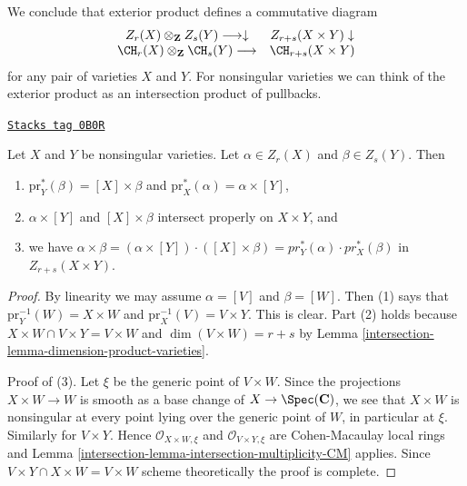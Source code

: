 We conclude that exterior product defines a commutative diagram
$$
\begin{array}{cc}Z_r(X) \otimes_\mathbf{Z} Z_s(Y) \longrightarrow\downarrow & Z_{r + s}(X \times Y) \downarrow \\ \CH_r(X) \otimes_\mathbf{Z} \CH_s(Y) \longrightarrow & \CH_{r + s}(X \times Y)\end{array}
$$
for any pair of varieties $X$ and $Y$. For nonsingular varieties
we can think of the exterior product as an intersection product
of pullbacks.

\begin{lemma}
\label{intersection-lemma-exterior-product}
\href{https://stacks.math.columbia.edu/tag/0B0R}{\texttt{Stacks tag 0B0R}}

Let $X$ and $Y$ be nonsingular varieties.
Let $\alpha \in Z_r(X)$ and $\beta \in Z_s(Y)$.
Then
\begin{enumerate}
\item $\text{pr}_Y^*(\beta) = [X] \times \beta$ and
$\text{pr}_X^*(\alpha) = \alpha \times [Y]$,
\item $\alpha \times [Y]$ and $[X]\times \beta$
intersect properly on $X\times Y$, and
\item we have
$\alpha \times \beta =
(\alpha \times [Y])\cdot ([X]\times\beta) =
pr_Y^*(\alpha) \cdot pr_X^*(\beta)$
in $Z_{r + s}(X \times Y)$.
\end{enumerate}
\end{lemma}

\begin{proof}

By linearity we may assume $\alpha = [V]$ and $\beta = [W]$.
Then (1) says that $\text{pr}_Y^{-1}(W) = X \times W$ and
$\text{pr}_X^{-1}(V) = V \times Y$. This is clear.
Part (2) holds because $X \times W \cap V \times Y = V \times W$ and
$\dim(V \times W) = r + s$ by Lemma \ref{intersection-lemma-dimension-product-varieties}.

\medskip\noindent
Proof of (3).
Let $\xi$ be the generic point of $V \times W$.
Since the projections $X \times W \to W$ is smooth as a base change of
$X \to \Spec(\mathbf{C})$, we see that $X \times W$ is nonsingular
at every point lying over the generic point of $W$, in particular at $\xi$.
Similarly for $V \times Y$. Hence $\mathcal{O}_{X \times W, \xi}$
and $\mathcal{O}_{V \times Y, \xi}$ are Cohen-Macaulay local rings
and Lemma \ref{intersection-lemma-intersection-multiplicity-CM} applies.
Since $V \times Y \cap X \times W = V \times W$ scheme theoretically
the proof is complete.
\end{proof}

